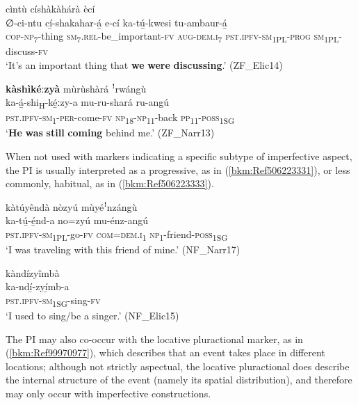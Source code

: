 \ea
\label{bkm:Ref99970760}
cìntù císhàkàhárà ècí \\
\gll ∅-ci-ntu    cí̲-shakahar-á̲    e-cí ka-tú̲-kwesi      tu-ambaur-á̲ \\
\textsc{cop}-\textsc{np}\textsubscript{7}-thing  \textsc{sm}\textsubscript{7}.\textsc{rel}-be\_important-\textsc{fv}  \textsc{aug}-\textsc{dem}.\textsc{i}\textsubscript{7}
\textsc{pst}.\textsc{ipfv}-\textsc{sm}\textsubscript{1PL}-\textsc{prog}  \textsc{sm}\textsubscript{1PL}-discuss-\textsc{fv}\\
\glt ‘It’s an important thing that \textbf{we} \textbf{were} \textbf{discussing}.’ (ZF\_Elic14)
\z

\ea
\label{bkm:Ref99970761}
\textbf{kàshìkéːzyà} mùrùshàrá ꜝrwángù\\
\gll ka-á̲-shi\textsubscript{H}-ké̲ːzy-a      mu-ru-shará    ru-angú\\
\textsc{pst}.\textsc{ipfv}-\textsc{sm}\textsubscript{1}-\textsc{per}-come-\textsc{fv}  \textsc{np}\textsubscript{18}-\textsc{np}\textsubscript{11}-back  \textsc{pp}\textsubscript{11}-\textsc{poss}\textsubscript{1SG}\\
\glt ‘\textbf{He} \textbf{was} \textbf{still} \textbf{coming} behind me.’ (ZF\_Narr13)
\z

When not used with markers indicating a specific subtype of imperfective aspect, the PI is usually interpreted as a progressive, as in (\ref{bkm:Ref506223331}), or less commonly, habitual, as in (\ref{bkm:Ref506223333}).

\newpage
\ea
\label{bkm:Ref506223331}
kàtúyêndà nòzyú mùyéꜝnzángù\\
\gll ka-tú̲-é̲nd-a      no=zyú  mu-énz-angú\\
\textsc{pst}.\textsc{ipfv}-\textsc{sm}\textsubscript{1PL}-go-\textsc{fv}  \textsc{com}=\textsc{dem}.\textsc{i}\textsubscript{1}  \textsc{np}\textsubscript{1}-friend-\textsc{poss}\textsubscript{1SG}\\
\glt ‘I was traveling with this friend of mine.’ (NF\_Narr17)
\z

\ea
\label{bkm:Ref506223333}
\glll kàndízyîmbà\\
ka-ndí̲-zyí̲mb-a\\
\textsc{pst}.\textsc{ipfv}-\textsc{sm}\textsubscript{1SG}-sing-\textsc{fv}\\
\glt ‘I used to sing/be a singer.’ (NF\_Elic15)
\z

The PI may also co-occur with the locative pluractional marker, as in (\ref{bkm:Ref99970977}), which describes that an event takes place in different locations; although not strictly aspectual, the locative pluractional does describe the internal structure of the event (namely its spatial distribution), and therefore may only occur with imperfective constructions.

